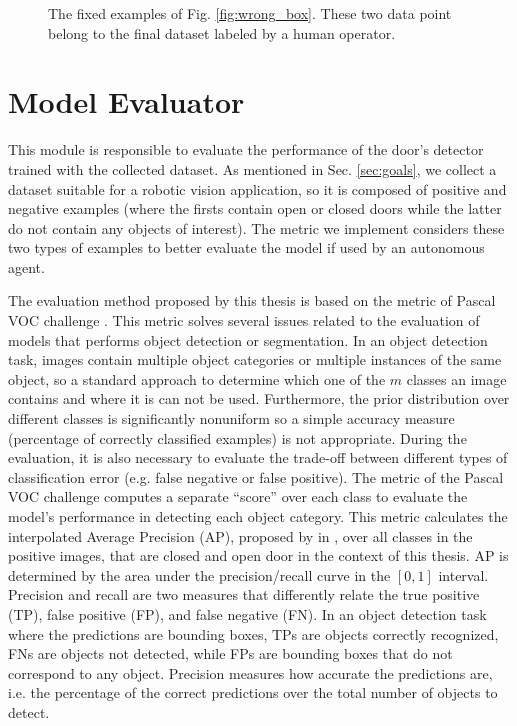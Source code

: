 \begin{figure}[h!]
	\caption{The fixed examples of Fig. \ref{fig:wrong_box}. These two data point belong to the final dataset labeled by a human operator.}
	\label{fig:correct_box}
\end{figure}

\section{Model Evaluator}

This module is responsible to evaluate the performance of the door's detector trained with the collected dataset. As mentioned in Sec. \ref{sec:goals}, we collect a dataset suitable for a robotic vision application, so it is composed of positive and negative examples (where the firsts contain open or closed doors while the latter do not contain any objects of interest). The metric we implement considers these two types of examples to better evaluate the model if used by an autonomous agent. 

The evaluation method proposed by this thesis is based on the metric of Pascal VOC challenge \cite{pascal}. This metric solves several issues related to the evaluation of models that performs object detection or segmentation. In an object detection task, images contain multiple object categories or multiple instances of the same object, so a standard approach to determine which one of the $m$ classes an image contains and where it is can not be used. Furthermore, the prior distribution over different classes is significantly nonuniform so a
simple accuracy measure (percentage of correctly classified
examples) is not appropriate. During the evaluation, it is also necessary
to evaluate the trade-off between different types of classification error (e.g. false negative or false positive). The metric of the Pascal VOC challenge computes a separate ``score'' over each class to evaluate the model's performance in detecting each object category.  This metric calculates the interpolated Average Precision (AP), proposed by \citeauthor{averageprecision} in \cite{averageprecision}, over all classes in the positive images, that are closed and open door in the context of this thesis. AP is determined by the area under the precision/recall curve in the $[0, 1]$ interval. Precision and recall are two measures that differently relate the true positive (TP), false positive (FP), and false negative (FN). In an object detection task where the predictions are bounding boxes, TPs are objects correctly recognized, FNs are objects not detected, while FPs are bounding boxes that do not correspond to any object. Precision measures how accurate the predictions are, i.e. the percentage of the correct predictions over the total number of objects to detect.

